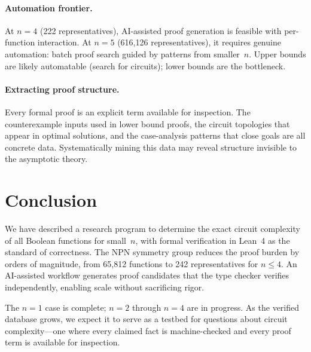 \documentclass[11pt]{article}
\begin{document}
\paragraph{Automation frontier.} At $n = 4$ (222 representatives), AI-assisted
proof generation is feasible with per-function interaction. At $n = 5$
(616{,}126 representatives), it requires genuine automation: batch proof search
guided by patterns from smaller~$n$. Upper bounds are likely automatable (search
for circuits); lower bounds are the bottleneck.

\paragraph{Extracting proof structure.} Every formal proof is an explicit term
available for inspection. The counterexample inputs used in lower bound proofs,
the circuit topologies that appear in optimal solutions, and the case-analysis
patterns that close goals are all concrete data. Systematically mining this
data may reveal structure invisible to the asymptotic theory.

\section{Conclusion}

We have described a research program to determine the exact circuit complexity
of all Boolean functions for small~$n$, with formal verification in Lean~4 as
the standard of correctness. The NPN symmetry group reduces the proof burden by
orders of magnitude, from 65{,}812 functions to 242 representatives for $n \le
4$. An AI-assisted workflow generates proof candidates that the type checker
verifies independently, enabling scale without sacrificing rigor.

The $n = 1$ case is complete; $n = 2$ through $n = 4$ are in progress. As the
verified database grows, we expect it to serve as a testbed for questions about
circuit complexity---one where every claimed fact is machine-checked and every
proof term is available for inspection.
\end{document}
